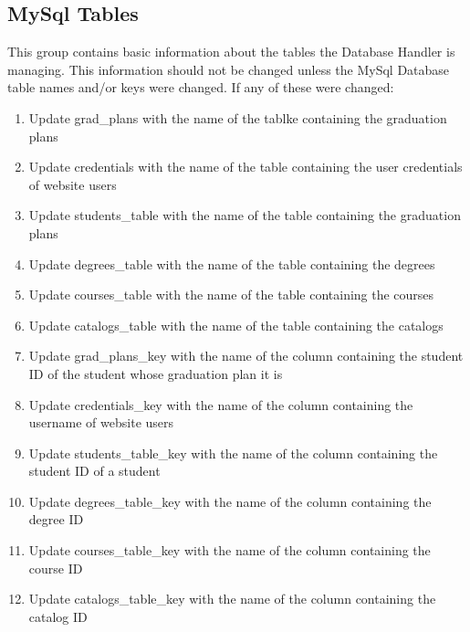 \documentclass[letterpaper]{article}
\begin{document}
	\subsection{MySql Tables}
	This group contains basic information about the tables the Database Handler is managing. This information should not be changed unless the MySql Database table names and/or keys were changed. If any of these were changed:
	\begin{enumerate}
		\item Update grad\_plans with the name of the tablke containing the graduation plans
		\item Update credentials with the name of the table containing the user credentials of website users
		\item Update students\_table with the name of the table containing the graduation plans
		\item Update degrees\_table with the name of the table containing the degrees
		\item Update courses\_table with the name of the table containing the courses
		\item Update catalogs\_table with the name of the table containing the catalogs
		\item Update grad\_plans\_key with the name of the column containing the student ID of the student whose graduation plan it is
		\item Update credentials\_key with the name of the column containing the username of website users
		\item Update students\_table\_key with the name of the column containing the student ID of a student
		\item Update degrees\_table\_key with the name of the column containing the degree ID
		\item Update courses\_table\_key with the name of the column containing the course ID
		\item Update catalogs\_table\_key with the name of the column containing the catalog ID
	\end{enumerate}
\end{document}
